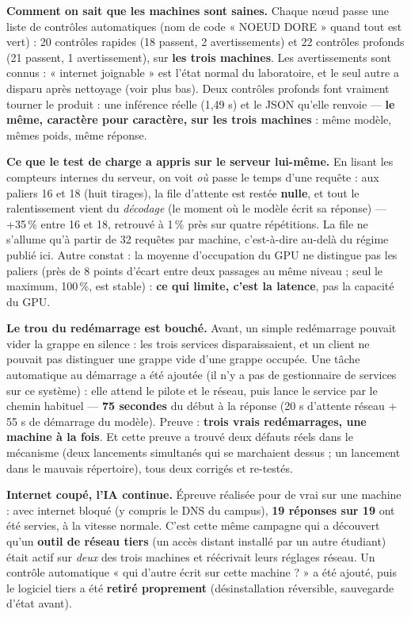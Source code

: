 \documentclass[10pt,a4paper]{article}
\begin{document}
\noindent\textbf{Comment on sait que les machines sont saines.} Chaque nœud passe une liste de
contrôles automatiques (nom de code « NOEUD DORE » quand tout est vert) : 20 contrôles rapides
(18 passent, 2 avertissements) et 22 contrôles profonds (21 passent, 1 avertissement), sur
\textbf{les trois machines}. Les avertissements sont connus : « internet joignable » est l'état
normal du laboratoire, et le seul autre a disparu après nettoyage (voir plus bas). Deux contrôles
profonds font vraiment tourner le produit : une inférence réelle (1,49 s) et le JSON qu'elle
renvoie — \textbf{le même, caractère pour caractère, sur les trois machines} : même modèle, mêmes
poids, même réponse.

\noindent\textbf{Ce que le test de charge a appris sur le serveur lui-même.} En lisant les
compteurs internes du serveur, on voit \emph{où} passe le temps d'une requête : aux paliers 16 et
18 (huit tirages), la file d'attente est restée \textbf{nulle}, et tout le ralentissement vient
du \emph{décodage} (le moment où le modèle écrit sa réponse) — +35\,\% entre 16 et 18, retrouvé à
1\,\% près sur quatre répétitions. La file ne s'allume qu'à partir de 32 requêtes par machine,
c'est-à-dire au-delà du régime publié ici. Autre constat : la moyenne d'occupation du GPU ne
distingue pas les paliers (près de 8 points d'écart entre deux passages au même niveau ; seul le
maximum, 100\,\%, est stable) : \textbf{ce qui limite, c'est la latence}, pas la capacité du GPU.

\noindent\textbf{Le trou du redémarrage est bouché.} Avant, un simple redémarrage pouvait vider la
grappe en silence : les trois services disparaissaient, et un client ne pouvait pas distinguer une
grappe vide d'une grappe occupée. Une tâche automatique au démarrage a été ajoutée (il n'y a pas de
gestionnaire de services sur ce système) : elle attend le pilote et le réseau, puis lance le
service par le chemin habituel — \textbf{75 secondes} du début à la réponse (20 s d'attente réseau
+ 55 s de démarrage du modèle). Preuve : \textbf{trois vrais redémarrages, une machine à la fois}.
Et cette preuve a trouvé deux défauts réels dans le mécanisme (deux lancements simultanés qui se
marchaient dessus ; un lancement dans le mauvais répertoire), tous deux corrigés et re-testés.

\noindent\textbf{Internet coupé, l'IA continue.} Épreuve réalisée pour de vrai sur une machine :
avec internet bloqué (y compris le DNS du campus), \textbf{19 réponses sur 19} ont été servies, à
la vitesse normale. C'est cette même campagne qui a découvert qu'un \textbf{outil de réseau tiers}
(un accès distant installé par un autre étudiant) était actif sur \emph{deux} des trois machines
et réécrivait leurs réglages réseau. Un contrôle automatique « qui d'autre écrit sur cette
machine ? » a été ajouté, puis le logiciel tiers a été \textbf{retiré proprement} (désinstallation
réversible, sauvegarde d'état avant).
\end{document}
